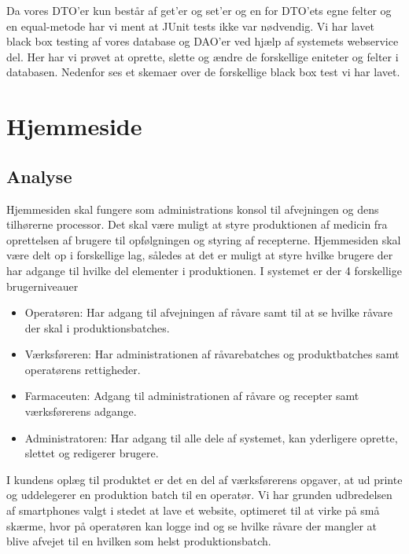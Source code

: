 \documentclass[a4paper]{article}
\begin{document}
Da vores DTO’er kun består af get’er og set’er og en for DTO’ets egne felter og en equal-metode har vi ment at JUnit tests ikke var nødvendig. Vi har lavet black box testing af vores database og DAO’er ved hjælp af systemets webservice del. Her har vi prøvet at oprette, slette og ændre de forskellige eniteter og felter i databasen. Nedenfor ses et skemaer over de forskellige black box test vi har lavet.



\section{Hjemmeside} %

\subsection{Analyse} %

Hjemmesiden skal fungere som administrations konsol til afvejningen og dens tilhørerne processor.  Det skal være muligt at styre produktionen af medicin fra oprettelsen af brugere til opfølgningen og styring af recepterne.  Hjemmesiden skal være delt op i forskellige lag, således at det er muligt at styre hvilke brugere der har adgange til hvilke del elementer i produktionen. I systemet er der 4 forskellige brugerniveauer
\begin{itemize}
  \item Operatøren: Har adgang til afvejningen af råvare samt til at se hvilke råvare der skal i produktionsbatches.
  \item Værksføreren: Har administrationen af råvarebatches og produktbatches samt operatørens rettigheder.
  \item Farmaceuten: Adgang til administrationen af råvare og recepter samt værksførerens adgange. 
  \item Administratoren: Har adgang til alle dele af systemet, kan yderligere oprette, slettet og redigerer brugere.
\end{itemize}
I kundens oplæg til produktet er det en del af værksførerens opgaver, at ud printe og uddelegerer en produktion batch til en operatør. Vi har grunden udbredelsen af smartphones valgt i stedet at lave et website, optimeret til at virke på små skærme, hvor på operatøren kan logge ind og se hvilke råvare der mangler at blive afvejet til en hvilken som helst produktionsbatch. 

\end{document}
